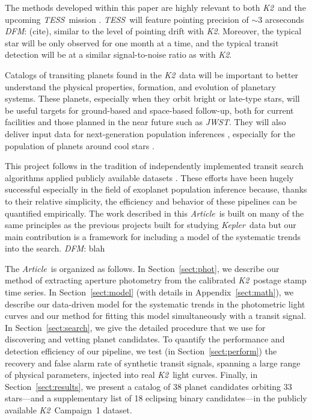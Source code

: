 \documentclass[12pt,preprint]{aastex}
\newcommand{\project}[1]{\textsl{#1}} %
\newcommand{\kepler}{\project{Kepler}}
\newcommand{\KT}{\project{K2}}
\newcommand{\tess}{\project{TESS}}
\newcommand{\jwst}{\project{JWST}}
\newcommand{\paper}{\textsl{Article}}
\newcommand{\sectionname}{Section}
\newcommand{\Sect}[1]{\sectionname~\ref{sect:#1}}
\newcommand{\sect}[1]{\Sect{#1}}
\newcommand{\App}[1]{Appendix~\ref{sect:#1}}
\newcommand{\app}[1]{\App{#1}}
\newcommand{\todo}[3]{{\color{#2}\emph{#1}: #3}}
\newcommand{\dfmtodo}[1]{\todo{DFM}{red}{#1}}
\begin{document}
The methods developed within this paper are highly relevant to both \KT\ and
the upcoming \tess\ mission \citep{Ricker:2014}.
\tess\ will feature pointing precision of $\sim 3$ arcseconds
\dfmtodo{(cite)}, similar to the level of pointing drift with \KT.
Moreover, the typical star will be only observed for one month at a time, and
the typical transit detection will be at a similar signal-to-noise ratio as
with \KT.

Catalogs of transiting planets found in the \KT\ data will be important to
better understand the physical properties, formation, and evolution of
planetary systems.
These planets, especially when they orbit bright or late-type stars, will be
useful targets for ground-based and space-based follow-up, both for current
facilities and those planned in the near future such as \jwst.
They will also deliver input data for next-generation population inferences
\citep{dfm}, especially for the population of planets around cool stars
\citep[for example,][]{dressing}.

This project follows in the tradition of independently implemented transit
search algorithms applied publicly available datasets \citep[such
as][]{petigura1, petigura2, roberto, dressing}.
These efforts have been hugely successful especially in the field of exoplanet
population inference because, thanks to their relative simplicity, the
efficiency and behavior of these pipelines can be quantified empirically.
The work described in this \paper\ is built on many of the same principles as
the previous projects built for studying \kepler\ data but our main
contribution is a framework for including a model of the systematic trends
into the search. \dfmtodo{blah}

The \paper\ is organized as follows.
In \sect{phot}, we describe our method of extracting aperture photometry from
the calibrated \KT\ postage stamp time series.
In \sect{model} (with details in \app{math}), we describe our data-driven
model for the systematic trends in the photometric light curves and our method
for fitting this model simultaneously with a transit signal.
In \sect{search}, we give the detailed procedure that we use for discovering
and vetting planet candidates.
To quantify the performance and detection efficiency of our pipeline, we test
(in \sect{perform}) the recovery and false alarm rate of synthetic transit
signals, spanning a large range of physical parameters, injected into real
\KT\ light curves.
Finally, in \sect{results}, we present a catalog of 38 planet candidates
orbiting 33 stars---and a supplementary list of 18 eclipsing binary
candidates---in the publicly available \KT\ Campaign~1 dataset.
\end{document}
